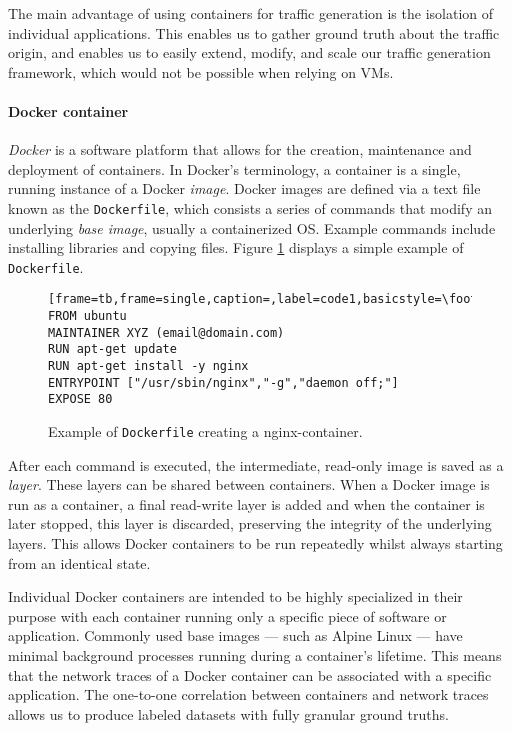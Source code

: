 The main advantage of using containers for traffic generation is the isolation of individual applications. This enables us to gather ground truth about the traffic origin, and enables us to easily extend, modify, and scale our traffic generation framework, which would not be possible when relying on VMs.

 



\paragraph*{Docker container}


\textit{Docker} is a software platform that allows for the creation, maintenance and deployment of containers. In Docker's terminology, a container is a single, running instance of a Docker \textit{image}. Docker images are defined via a text file known as the \texttt{Dockerfile}, which consists a series of commands that modify an underlying \textit{base image}, usually a containerized OS. Example commands include installing libraries and copying files. Figure \ref{fig:dockerfile} displays a simple example of \texttt{Dockerfile}.


\begin{figure}
\begin{lstlisting}[frame=tb,frame=single,caption=,label=code1,basicstyle=\footnotesize]
FROM ubuntu
MAINTAINER XYZ (email@domain.com)
RUN apt-get update
RUN apt-get install -y nginx
ENTRYPOINT ["/usr/sbin/nginx","-g","daemon off;"]
EXPOSE 80
\end{lstlisting}
 \caption{Example of \texttt{Dockerfile} creating a nginx-container.}
 \label{fig:dockerfile}
\end{figure}

After each command is executed, the intermediate, read-only image is saved as a \textit{layer}. These layers can be shared between containers. When a Docker image is run as a container, a final read-write layer is added and when the container is later stopped, this layer is discarded, preserving the integrity of the underlying layers. This allows Docker containers to be run repeatedly whilst always starting from an identical state. 


Individual Docker containers are intended to be highly specialized in their purpose with each container running only a specific piece of software or application. Commonly used base images --- such as Alpine Linux --- have minimal background processes running during a container's lifetime. This means that the network traces of a Docker container can be associated with a specific application. The one-to-one correlation between containers and network traces allows us to produce labeled datasets with fully granular ground truths.

